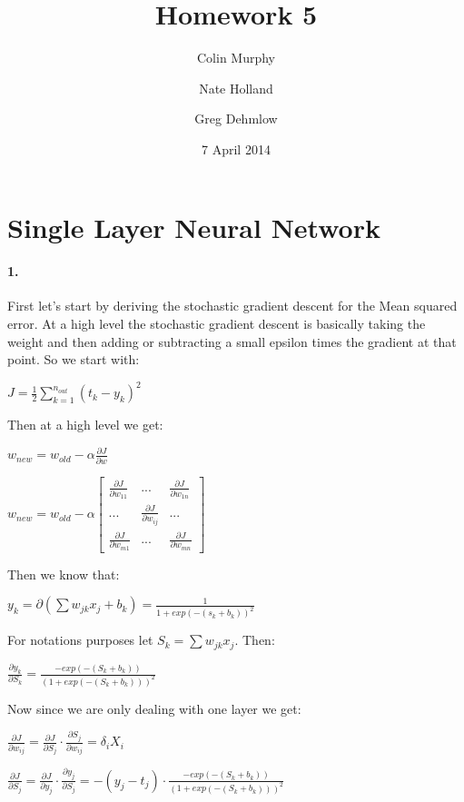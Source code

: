 \documentclass[12pt]{article}
\title{Homework 5}
\date{7 April 2014}
\author{Colin Murphy\\
\and
Nate Holland\\ 
\and
Greg Dehmlow
}
\begin{document}
\vspace{-5em}
\maketitle

\section*{Single Layer Neural Network}

\paragraph{1.}

First let's start by deriving the stochastic gradient descent for the Mean squared error.
At a high level the stochastic gradient descent is basically taking the weight and then adding or subtracting a small epsilon times the gradient at that point. So we start with:

$J = \frac{1}{2}\sum\limits_{k=1}^{n_{out}} (t_k - y_k)^2
$

Then at a high level we get:

$w_{new} = w_{old} - \alpha\frac{\partial J }{\partial w}$

$w_{new} = w_{old} - \alpha \left[ \begin{array}{ccc}
\frac{\partial J}{\partial w_{11}} & ... & \frac{\partial J}{\partial w_{1n}}\\
... & \frac{\partial J}{\partial w_{ij}} & ... \\
\frac{\partial J}{\partial w_{m1}} & ... & \frac{\partial J}{\partial w_{mn}} \end{array} \right]$

Then we know that:

$y_k = \partial(\sum w_{jk}x_j + b_k) = \frac{1}{1 + exp(-(s_k + b_k))^2}$

For notations purposes let $S_k =  \sum w_{jk}x_j$. Then:

$\frac{\partial y_k}{\partial S_k} =
\frac{-exp(-(S_k + b_k))}{(1 + exp(-(S_k + b_k)))^2}$

Now since we are only dealing with one layer we get:

$\frac{\partial J}{\partial w_{ij}} = 
\frac{\partial J}{\partial S_j} \cdot \frac{\partial S_j}{\partial w_{ij}}
= \delta_i X_i$

$\frac{\partial J}{\partial S_j} = 
\frac{\partial J}{\partial y_j} \cdot \frac{\partial y_j}{\partial S_j}
= -(y_j - t_j) \cdot \frac{-exp(-(S_k + b_k))}{(1 + exp(-(S_k + b_k)))^2}
$ 
\end{document}

